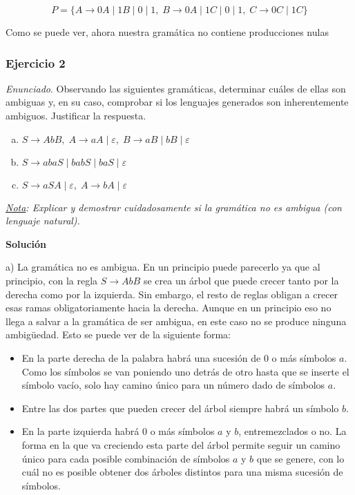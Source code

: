 \documentclass[11pt,a4paper]{article}
\newcommand{\enu}{\textit{Enunciado}}
\newcommand{\sol}{\textbf{Solución}}
\begin{document}
		\[P = \{A \rightarrow 0A \; | \; 1B \; | \; 0 \; | \; 1, \; B \rightarrow 0A \; | \; 1C \; | \; 0 \; | \; 1, \;
				C \rightarrow 0C \; | \; 1C\} \]
		
		Como se puede ver, ahora nuestra gramática no contiene producciones nulas
		
		\subsubsection{Ejercicio 2}
		\enu. Observando las siguientes gramáticas, determinar cuáles de ellas son ambiguas y, en su caso, comprobar si los
		lenguajes generados son inherentemente ambiguos. Justificar la respuesta.
		
		\begin{enumerate}[a)]
			\item $S \rightarrow AbB, \; A \rightarrow aA \; | \; \varepsilon, \; B \rightarrow aB \; | \; bB \; | \;
			\varepsilon$
			\item $S \rightarrow abaS \; | \; babS  \; | \; baS \; | \; \varepsilon$
			\item $S \rightarrow aSA \; | \; \varepsilon, \; A \rightarrow bA \; | \; \varepsilon$
		\end{enumerate}
		
		\textit{\underline{Nota}: Explicar y demostrar cuidadosamente si la gramática no es ambigua (con lenguaje natural).}
		
		\sol \par
		
		a) La gramática no es ambigua. En un principio puede parecerlo ya que al principio, con la regla $S \rightarrow AbB$
		se crea un árbol que puede crecer tanto por la derecha como por la izquierda. Sin embargo, el resto de reglas obligan
		a crecer esas ramas obligatoriamente hacia la derecha. Aunque en un principio eso no llega a salvar a la gramática de
		ser ambigua, en este caso no se produce ninguna ambigüedad. Esto se puede ver de la siguiente forma:
		
		\begin{itemize}
			\item En la parte derecha de la palabra habrá una sucesión de 0 o más símbolos $a$. Como los símbolos se van
			poniendo uno detrás de otro hasta que se inserte el símbolo vacío, solo hay camino único para un número dado
			de símbolos $a$.
			\item Entre las dos partes que pueden crecer del árbol siempre habrá un símbolo $b$.
			\item En la parte izquierda habrá 0 o más símbolos $a$ y $b$, entremezclados o no. La forma en la que va creciendo
			esta parte del árbol permite seguir un camino único para cada posible combinación de símbolos $a$ y $b$ que se
			genere, con lo cuál no es posible obtener dos árboles distintos para una misma sucesión de símbolos.
		\end{itemize}
		
\end{document}

